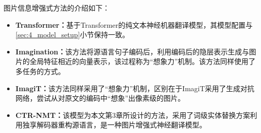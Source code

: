 图片信息增强式方法的介绍如下：
\begin{itemize}
\item \textbf{Transformer：}基于Transformer的纯文本神经机器翻译模型，其模型配置与\ref{sec:4_model_setup}小节保持一致。
\item \textbf{Imagination：}该方法将源语言句子编码后，利用编码后的隐层表示生成与图片的全局特征相近的向量表示，该过程称为“想象力”机制。该方法同样使用了多任务的方式。
\item \textbf{ImagiT：}该方法同样采用了“想象力”机制，区别在于ImagiT采用了生成对抗网络，尝试从对原文的编码中“想象”出像素级的图片。
\item \textbf{CTR-NMT：}该模型为本文第3章所设计的方法，采用了词级实体替换方案利用独享解码器重构源语言，是一种图片增强式神经翻译模型。
\end{itemize}